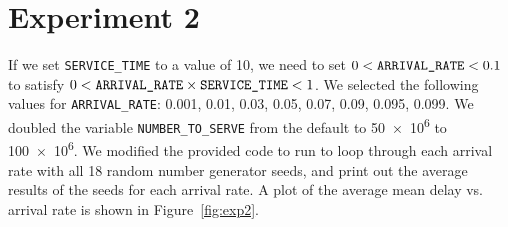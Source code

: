 \section*{Experiment 2}
If we set \texttt{SERVICE\_TIME} to a value of 10, we need to set $0 < \text{\texttt{ARRIVAL\_RATE}} < 0.1$ to satisfy $0 < \text{\texttt{ARRIVAL\_RATE}} \times \text{\texttt{SERVICE\_TIME}} < 1$. We selected the following values for \texttt{ARRIVAL\_RATE}: 0.001, 0.01, 0.03, 0.05, 0.07, 0.09, 0.095, 0.099. We doubled the variable \texttt{NUMBER\_TO\_SERVE} from the default to \num{50e6} to \num{100e6}. We modified the provided code to run to loop through each arrival rate with all 18 random number generator seeds, and print out the average results of the seeds for each arrival rate.
A plot of the average mean delay vs. arrival rate is shown in Figure~\ref{fig:exp2}.


